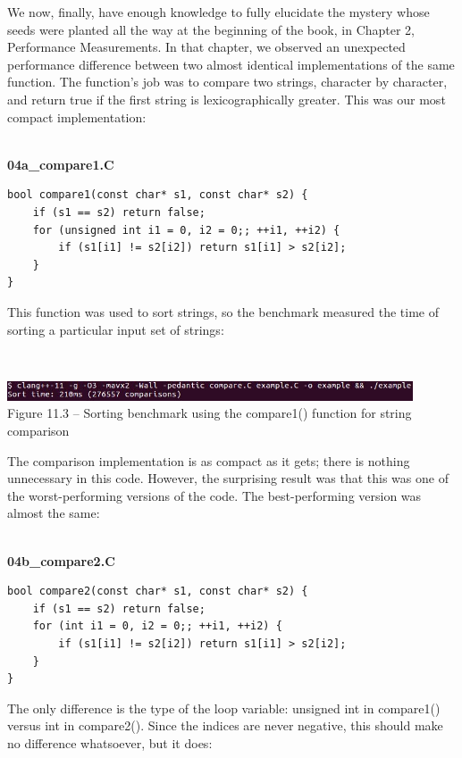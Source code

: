 We now, finally, have enough knowledge to fully elucidate the mystery whose seeds were planted all the way at the beginning of the book, in Chapter 2, Performance Measurements. In that chapter, we observed an unexpected performance difference between two almost identical implementations of the same function. The function's job was to compare two strings, character by character, and return true if the first string is lexicographically greater. This was our most compact implementation:

\hspace*{\fill} \\ %
\noindent
\textbf{04a\_compare1.C}
\begin{lstlisting}[style=styleCXX]
bool compare1(const char* s1, const char* s2) {
	if (s1 == s2) return false;
	for (unsigned int i1 = 0, i2 = 0;; ++i1, ++i2) {
		if (s1[i1] != s2[i2]) return s1[i1] > s2[i2];
	}
}
\end{lstlisting}

This function was used to sort strings, so the benchmark measured the time of sorting a particular input set of strings:

\hspace*{\fill} \\ %
\begin{center}
\includegraphics[width=0.9\textwidth]{content/3/chapter11/images/3.jpg}\\
Figure 11.3 – Sorting benchmark using the compare1() function for string comparison
\end{center}

The comparison implementation is as compact as it gets; there is nothing unnecessary in this code. However, the surprising result was that this was one of the worst-performing versions of the code. The best-performing version was almost the same:

\hspace*{\fill} \\ %
\noindent
\textbf{04b\_compare2.C}
\begin{lstlisting}[style=styleCXX]
bool compare2(const char* s1, const char* s2) {
	if (s1 == s2) return false;
	for (int i1 = 0, i2 = 0;; ++i1, ++i2) {
		if (s1[i1] != s2[i2]) return s1[i1] > s2[i2];
	}
}
\end{lstlisting}

The only difference is the type of the loop variable: unsigned int in compare1() versus int in compare2(). Since the indices are never negative, this should make no difference whatsoever, but it does:


